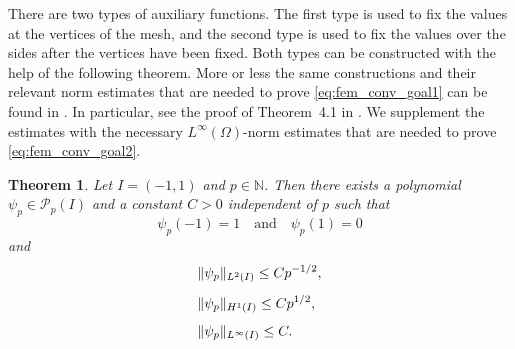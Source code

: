 \documentclass[english, 12pt, a4paper, sci, utf8, a-2b, online]{aaltothesis}
\theoremstyle{definition}
\theoremstyle{plain}
\newtheorem{theorem}{Theorem}[section]
\DeclarePairedDelimiter\norm{\lVert}{\rVert}
\numberwithin{equation}{section}
\begin{document}
There are two types of auxiliary functions.
The first type is used to fix the values at the vertices of the mesh,
and the second type is used to fix the values over the sides after the vertices have been fixed.
Both types can be constructed with the help of the following theorem.
More or less the same constructions and their relevant norm estimates that are needed to prove
\eqref{eq:fem_conv_goal1} can be found in \cite{babuskasuri1987}.
In particular, see the proof of Theorem~4.1 in \cite{babuskasuri1987}.
We supplement the estimates with the necessary $L^{\infty}(\Omega)$-norm estimates
that are needed to prove \eqref{eq:fem_conv_goal2}.
\begin{theorem}
    \label{thm:auxiliary_auxiliary_function}
    Let $I=(-1,1)$ and $p \in \mathbb{N}$.
    Then there exists a polynomial $\psi_p \in \mathcal{P}_p(I)$ and
    a constant $C > 0$ independent of $p$ such that
    \begin{equation}
        \label{eq:auxiliary_auxiliary_function_endpoints}
        \psi_p(-1)=1 \quad \text{and} \quad \psi_p(1)=0
    \end{equation}
    and
    \begin{align}
        \label{eq:auxiliary_auxiliary_function_res1}
        &\norm{\psi_p}_{L^2(I)} \leq C p^{-1/2}, \\[0.5em]
        \label{eq:auxiliary_auxiliary_function_res2}
        &\norm{\psi_p}_{H^1(I)} \leq C p^{1/2}, \\[0.5em]
        \label{eq:auxiliary_auxiliary_function_res3}
        &\norm{\psi_p}_{L^{\infty}(I)} \leq C.
    \end{align}
\end{theorem}
\end{document}
